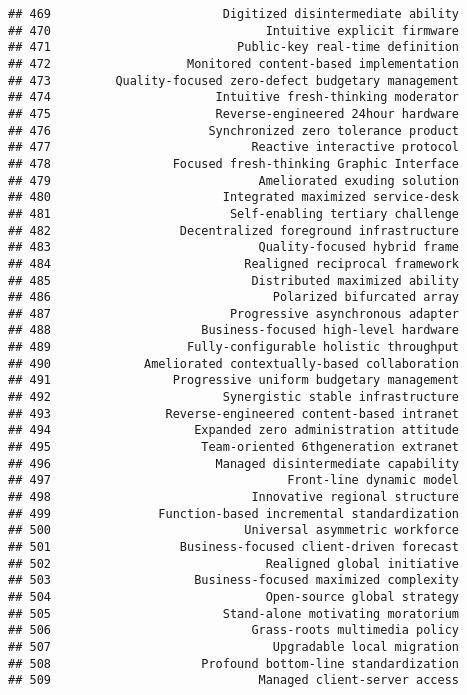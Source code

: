 \documentclass[
]{article}
\begin{document}
\begin{verbatim}
## 469                        Digitized disintermediate ability
## 470                              Intuitive explicit firmware
## 471                          Public-key real-time definition
## 472                   Monitored content-based implementation
## 473         Quality-focused zero-defect budgetary management
## 474                       Intuitive fresh-thinking moderator
## 475                       Reverse-engineered 24hour hardware
## 476                      Synchronized zero tolerance product
## 477                            Reactive interactive protocol
## 478                 Focused fresh-thinking Graphic Interface
## 479                             Ameliorated exuding solution
## 480                        Integrated maximized service-desk
## 481                         Self-enabling tertiary challenge
## 482                  Decentralized foreground infrastructure
## 483                             Quality-focused hybrid frame
## 484                           Realigned reciprocal framework
## 485                            Distributed maximized ability
## 486                               Polarized bifurcated array
## 487                         Progressive asynchronous adapter
## 488                     Business-focused high-level hardware
## 489                   Fully-configurable holistic throughput
## 490             Ameliorated contextually-based collaboration
## 491                 Progressive uniform budgetary management
## 492                        Synergistic stable infrastructure
## 493                Reverse-engineered content-based intranet
## 494                    Expanded zero administration attitude
## 495                     Team-oriented 6thgeneration extranet
## 496                       Managed disintermediate capability
## 497                                 Front-line dynamic model
## 498                            Innovative regional structure
## 499               Function-based incremental standardization
## 500                           Universal asymmetric workforce
## 501                  Business-focused client-driven forecast
## 502                              Realigned global initiative
## 503                    Business-focused maximized complexity
## 504                              Open-source global strategy
## 505                        Stand-alone motivating moratorium
## 506                            Grass-roots multimedia policy
## 507                               Upgradable local migration
## 508                     Profound bottom-line standardization
## 509                             Managed client-server access

\end{verbatim}
\end{document}
